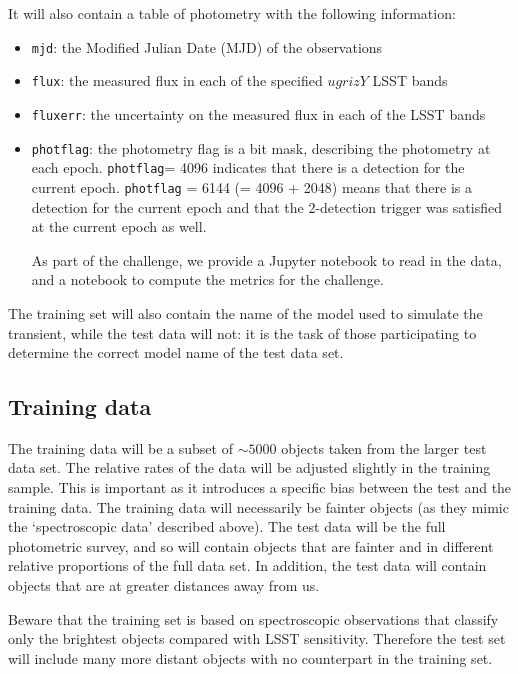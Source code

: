 \documentclass[\docopts]{\docclass}
\begin{document}
It will also contain a table of photometry with the following information:
\begin{itemize}
\item {\tt mjd}: the Modified Julian Date (MJD) of the observations
\item {\tt flux}: the measured flux in each of the specified $ugrizY$ LSST bands
\item {\tt fluxerr}: the uncertainty on the measured flux in each of the LSST bands
\item {\tt photflag}: the photometry flag is a bit mask, describing the photometry at each epoch. {\tt photflag}= 4096 indicates that there is a detection for the current epoch. {\tt photflag} = 6144 (= 4096 + 2048) means that there is a detection for the current epoch and that the 2-detection trigger was satisfied at the current epoch as well.

\clearpage
As part of the challenge, we provide a Jupyter notebook to read in the data, and a notebook to compute the metrics for the challenge.
\end{itemize}

The training set will also contain the name of the model used to simulate the transient, while the test data will not: it is the task of those participating to determine the correct model name of the test data set.


\subsection{Training data}
The training data will be a subset of $\sim 5000$ objects taken from the larger test data set. The relative rates of the data will be adjusted slightly in the training sample. This is important as it introduces a specific bias between the test and the training data. The training data will necessarily be fainter objects (as they mimic the `spectroscopic data' described above). The test data will be the full photometric survey, and so will contain objects that are fainter and in different relative proportions of the full data set. In addition, the test data will contain objects that are at greater distances away from us.

Beware that the training set is based on spectroscopic observations that classify only the brightest objects compared with LSST sensitivity. Therefore the test set will include many more distant objects with no counterpart in the training set.



\end{document}
